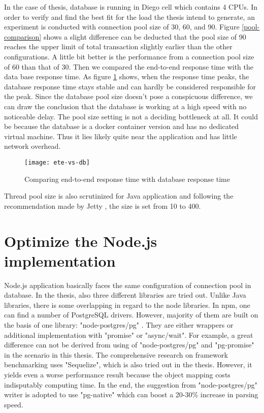 In the case of thesis, database is running in Diego cell which contains 4 CPUs. In order to verify and find the best fit for the load the thesis intend to generate, an experiment is conducted with connection pool size of 30, 60, and 90.  Figure \ref{pool-comparison} shows a slight difference can be deducted that the pool size of 90 reaches the upper limit of total transaction slightly earlier than the other configurations. A little bit better is the performance from a connection pool size of 60 than that of 30. Then we compared the end-to-end response time with the data base response time.  As figure \ref{ete-vs-db} shows, when the response time peaks, the database response time stays stable and can hardly be considered responsible for the peak. Since the database pool size doesn't pose a conspicuous difference, we can draw the conclusion that the database is working at a high speed with no noticeable delay. The pool size setting is not a deciding bottleneck at all. It could be because the database is a docker container version and has no dedicated virtual machine. Thus it lies likely quite near the application and has little network overhead. 

\begin{figure}[h]
	\centering
	\texttt{[image: ete-vs-db]}
	\caption{Comparing end-to-end response time with database response time}
	\label{ete-vs-db}
\end{figure}

Thread pool size is also scrutinized for Java application and following the recommendation made by Jetty \citep{threadpool}, the size is set from 10 to 400. \\


\section{Optimize the Node.js implementation}
Node.js application basically faces the same configuration of connection pool in database. In the thesis, also three different libraries are tried out. Unlike Java libraries, there is some overlapping in regard to the node libraries. In npm, one can find a number of PostgreSQL drivers. However, majority of them are built on the basis of one library: "node-postgres/pg" \citep{node-pg}. They are either wrappers or additional implementation with "promise" or "async/wait". For example, a great difference can not be derived from using of "node-postgres/pg" and "pg-promise" in the scenario in this thesis. The comprehensive research on framework benchmarking \citep{Benchmark} uses "Sequelize", which is also tried out in the thesis. However, it yields even a worse performance result because the object mapping costs indisputably computing time. In the end, the suggestion from "node-postgres/pg" writer is adopted to use "pg-native" which can boost a 20-30\% increase in parsing speed.\\




